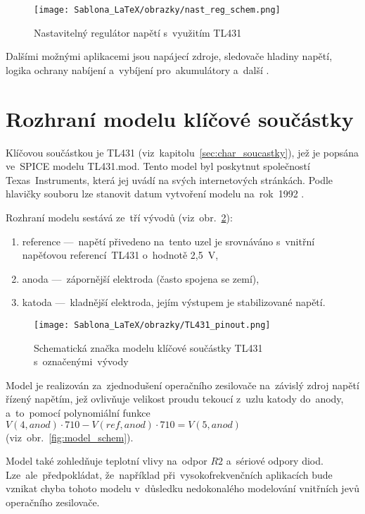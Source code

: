 \documentclass[12pt]{CLASS/protokol}
\begin{document}
    \begin{figure}[h]
        \centering
        \texttt{[image: Sablona\_LaTeX/obrazky/nast\_reg\_schem.png]}
        \caption{Nastavitelný regulátor napětí s~využitím TL431 \cite{TI_TL431_datasheet}}
        \label{fig:nastreg_schem}
    \end{figure}
    
    \par
    Dalšími možnými aplikacemi jsou napájecí zdroje, sledovače hladiny napětí, logika ochrany nabíjení a~vybíjení pro~akumulátory a~další \cite{TI_TL431_datasheet}.

    
    
\clearpage
\newpage
\section{Rozhraní modelu klíčové součástky}\label{sec:rozhrani}
    Klíčovou součástkou je TL431 (viz~kapitolu~\ref{sec:char_soucastky}), jež je popsána ve~SPICE modelu TL431.mod. Tento model byl poskytnut společností Texas~Instruments, která jej uvádí na svých internetových stránkách. Podle hlavičky souboru lze stanovit datum vytvoření modelu na~rok~1992 \cite{TL431_spice_model}.
    \par
    Rozhraní modelu sestává ze~tří vývodů (viz~obr.~\ref{fig:TL431_schematic}):
    \begin{enumerate}
        \item reference ---~napětí přivedeno na~tento uzel je srovnáváno s~vnitřní napěťovou referencí~TL431 o~hodnotě 2,5~V,
        \item anoda ---~zápornější elektroda (často spojena se zemí),
        \item katoda ---~kladnější elektroda, jejím výstupem je stabilizované napětí.
    \end{enumerate}
    
    \begin{figure}[h]
        \centering
        \texttt{[image: Sablona\_LaTeX/obrazky/TL431\_pinout.png]}
        \caption{Schematická značka modelu klíčové součástky TL431 s~označenými~vývody}
        \label{fig:TL431_schematic}
    \end{figure}

    \par
    Model je realizován za~zjednodušení operačního zesilovače na~závislý zdroj napětí řízený napětím, jež ovlivňuje velikost proudu tekoucí z~uzlu katody do~anody, a~to~pomocí polynomiální funkce $V(4,anod) \cdot 710 - V(ref,anod) \cdot 710 = V(5,anod)$ (viz~obr.~\ref{fig:model_schem}).
    \par
    Model také zohledňuje teplotní vlivy na~odpor $R2$ a~sériové odpory diod. Lze~ale~předpokládat, že~například při~vysokofrekvenčních aplikacích bude vznikat chyba tohoto modelu v~důsledku nedokonalého modelování vnitřních jevů operačního zesilovače.
    
\end{document}
